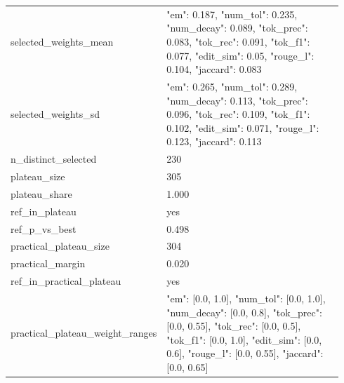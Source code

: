 \begin{longtable}{p{0.122\linewidth}p{0.820\linewidth}}
selected\_\allowbreak{}weights\_\allowbreak{}mean & {"em": 0.187, "num\_\allowbreak{}tol": 0.235, "num\_\allowbreak{}decay": 0.089, "tok\_\allowbreak{}prec": 0.083, "tok\_\allowbreak{}rec": 0.091, "tok\_\allowbreak{}f1": 0.077, "edit\_\allowbreak{}sim": 0.05, "rouge\_\allowbreak{}l": 0.104, "jaccard": 0.083} \\
selected\_\allowbreak{}weights\_\allowbreak{}sd & {"em": 0.265, "num\_\allowbreak{}tol": 0.289, "num\_\allowbreak{}decay": 0.113, "tok\_\allowbreak{}prec": 0.096, "tok\_\allowbreak{}rec": 0.109, "tok\_\allowbreak{}f1": 0.102, "edit\_\allowbreak{}sim": 0.071, "rouge\_\allowbreak{}l": 0.123, "jaccard": 0.113} \\
n\_\allowbreak{}distinct\_\allowbreak{}selected & 230 \\
plateau\_\allowbreak{}size & 305 \\
plateau\_\allowbreak{}share & 1.000 \\
ref\_\allowbreak{}in\_\allowbreak{}plateau & yes \\
ref\_\allowbreak{}p\_\allowbreak{}vs\_\allowbreak{}best & 0.498 \\
practical\_\allowbreak{}plateau\_\allowbreak{}size & 304 \\
practical\_\allowbreak{}margin & 0.020 \\
ref\_\allowbreak{}in\_\allowbreak{}practical\_\allowbreak{}plateau & yes \\
practical\_\allowbreak{}plateau\_\allowbreak{}weight\_\allowbreak{}ranges & {"em": [0.0, 1.0], "num\_\allowbreak{}tol": [0.0, 1.0], "num\_\allowbreak{}decay": [0.0, 0.8], "tok\_\allowbreak{}prec": [0.0, 0.55], "tok\_\allowbreak{}rec": [0.0, 0.5], "tok\_\allowbreak{}f1": [0.0, 1.0], "edit\_\allowbreak{}sim": [0.0, 0.6], "rouge\_\allowbreak{}l": [0.0, 0.55], "jaccard": [0.0, 0.65]} \\
\bottomrule
\end{longtable}
\normalsize
